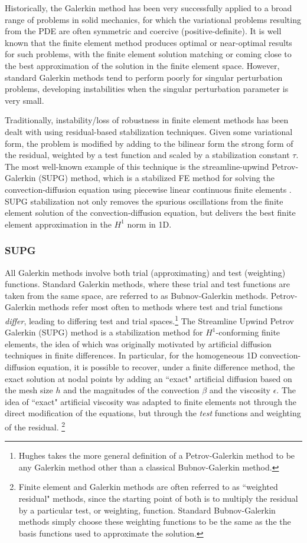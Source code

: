 Historically, the Galerkin method has been very successfully applied to a broad range of problems in solid mechanics, for which the variational problems resulting from the PDE are often symmetric and coercive (positive-definite). It is well known that the finite element method produces optimal or near-optimal results for such problems, with the finite element solution matching or coming close to the best approximation of the solution in the finite element space. However, standard Galerkin methods tend to perform poorly for singular perturbation problems, developing instabilities when the singular perturbation parameter is very small. 

Traditionally, instability/loss of robustness in finite element methods has been dealt with using residual-based stabilization techniques.  Given some variational form, the problem is modified by adding to the bilinear form the strong form of the residual, weighted by a test function and scaled by a stabilization constant $\tau$.  The most well-known example of this technique is the streamline-upwind Petrov-Galerkin (SUPG) method, which is a stabilized FE method for solving the convection-diffusion equation using piecewise linear continuous finite elements \cite{SUPG}.  SUPG stabilization not only removes the spurious oscillations from the finite element solution of the convection-diffusion equation, but delivers the best finite element approximation in the $H^1$ norm in 1D.  

\subsubsection{SUPG}

All Galerkin methods involve both trial (approximating) and test (weighting) functions.   Standard Galerkin methods, where these trial and test functions are taken from the same space, are referred to as Bubnov-Galerkin methods.  Petrov-Galerkin methods refer most often to methods where test and trial functions \emph{differ}, leading to differing test and trial spaces.\footnote{Hughes takes the more general definition of a Petrov-Galerkin method to be any Galerkin method other than a classical Bubnov-Galerkin method.}  The Streamline Upwind Petrov Galerkin (SUPG) method is a stabilization method for $H^1$-conforming finite elements, the idea of which was originally motivated by artificial diffusion techniques in finite differences.  In particular, for the homogeneous 1D convection-diffusion equation, it is possible to recover, under a finite difference method, the exact solution at nodal points by adding an ``exact" artificial diffusion based on the mesh size $h$ and the magnitudes of the convection $\beta$ and the viscosity $\epsilon$.  The idea of ``exact" artificial viscosity was adapted to finite elements not through the direct modification of the equations, but through the \emph{test} functions and weighting of the residual. \footnote{Finite element and Galerkin methods are often referred to as ``weighted residual" methods, since the starting point of both is to multiply the residual by a particular test, or weighting, function.  Standard Bubnov-Galerkin methods simply choose these weighting functions to be the same as the the basis functions used to approximate the solution.  }

